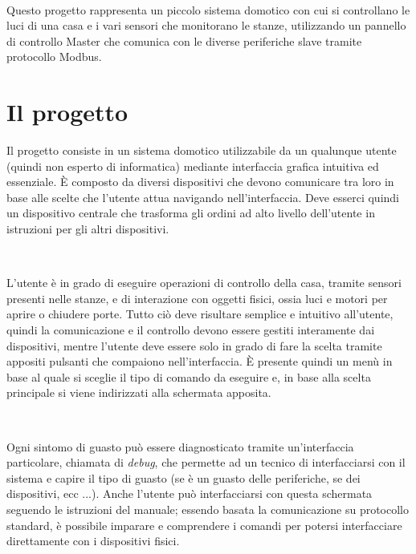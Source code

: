 \documentclass[a4paper,titlepage]{book}
\begin{document}
~

Questo progetto rappresenta un piccolo sistema domotico con cui si controllano le luci di una casa e i vari sensori che monitorano le stanze, utilizzando un pannello di controllo Master che comunica con le diverse periferiche slave tramite protocollo Modbus.


\tableofcontents




\chapter{Il progetto}

Il progetto consiste in un sistema domotico utilizzabile da un qualunque utente (quindi non esperto di informatica) mediante interfaccia grafica intuitiva ed essenziale. È composto da diversi dispositivi che devono comunicare tra loro in base alle scelte che l'utente attua navigando nell'interfaccia. Deve esserci quindi un dispositivo centrale che trasforma gli ordini ad alto livello dell'utente in istruzioni per gli altri dispositivi.

~

L'utente è in grado di eseguire operazioni di controllo della casa, tramite sensori presenti nelle stanze, e di interazione con oggetti fisici, ossia luci e motori per aprire o chiudere porte. Tutto ciò deve risultare semplice e intuitivo all'utente, quindi la comunicazione e il controllo devono essere gestiti interamente dai dispositivi, mentre l'utente deve essere solo in grado di fare la scelta tramite appositi pulsanti che compaiono nell'interfaccia. È presente quindi un menù in base al quale si sceglie il tipo di comando da eseguire e, in base alla scelta principale si viene indirizzati alla schermata apposita.

~

Ogni sintomo di guasto può essere diagnosticato tramite un'interfaccia particolare, chiamata di \textit{debug}, che permette ad un tecnico di interfacciarsi con il sistema e capire il tipo di guasto (se è un guasto delle periferiche, se dei dispositivi, ecc ...). Anche l'utente può interfacciarsi con questa schermata seguendo le istruzioni del manuale; essendo basata la comunicazione su protocollo standard, è possibile imparare e comprendere i comandi per potersi interfacciare direttamente con i dispositivi fisici.  
\end{document}
